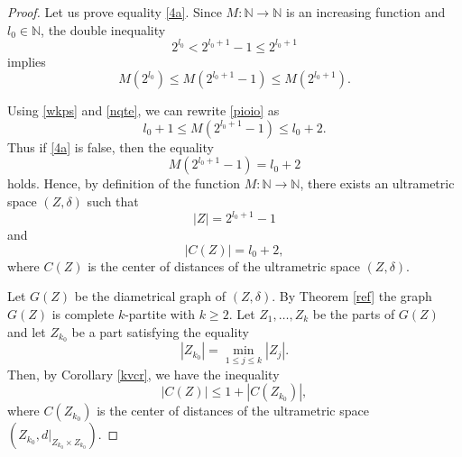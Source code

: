 \documentclass[pdflatex,sn-mathphys-num]{sn-jnl}%
\theoremstyle{thmstyleone}%
\theoremstyle{thmstyletwo}%
\theoremstyle{thmstylethree}%
\theoremstyle{thmstyletwo}%
\theoremstyle{thmstylethree}%
\begin{document}
\begin{proof}
Let us prove equality \eqref{4a}.
Since \( M:\mathbb{N} \to \mathbb{N} \) is an increasing function and $l_0\in \mathbb N$, the double inequality
\begin{equation}
    \label{wcgqq}
2^{l_0} <2^{l_0+1} - 1 \le 2^{l_0+1} 
\end{equation}
implies 
\begin{equation}
    \label{pioio}
M(2^{l_0}) \le M(2^{l_0+1}-1) \le M(2^{l_0+1}).
\end{equation}

Using \eqref{wkps} and \eqref{nqte}, we can rewrite \eqref{pioio} as
\[
l_0 + 1 \le M(2^{l_0+1}-1) \le l_0 + 2.
\]
Thus if \eqref{4a} is false, then the equality
\begin{equation}\label{1z}
    M(2^{l_0+1}-1)=l_0+2
\end{equation}
holds.
Hence, by definition of the function $M : \mathbb{N} \to \mathbb{N}$, there exists an ultrametric space $(Z,\delta)$ such that
\begin{equation}\label{2z}
|Z| = 2^{l_0+1} - 1
\end{equation}
and
\begin{equation}\label{3z}
|C(Z)| = l_0 + 2,
\end{equation}
where $C(Z)$ is the center of distances of the ultrametric space $(Z,\delta)$.

Let $G(Z)$ be the diametrical graph of $(Z,\delta)$.
By Theorem \ref{ref} the graph
$G(Z)$ is complete $k$-partite with $k\ge2$.
Let $Z_1,\dots,Z_k$ be the parts of $G(Z)$ and let $Z_{k_0}$ be a part satisfying the equality
\begin{equation}
|Z_{k_0}|=\min\limits_{1\leq j \leq k}|Z_j|.
\label{vslq-1}
\end{equation}
Then, by Corollary \ref{kvcr},  we have the inequality
\begin{equation}
    \label{sas12-1}
|C(Z)| \le 1 + |C(Z_{k_0})|,
\end{equation}
where \(C(Z_{k_0})\) is the center of distances of the ultrametric space
\(
(Z_{k_0}, d|_{Z_{k_0} \times Z_{k_0}}).
\)




\end{proof}
\end{document}
